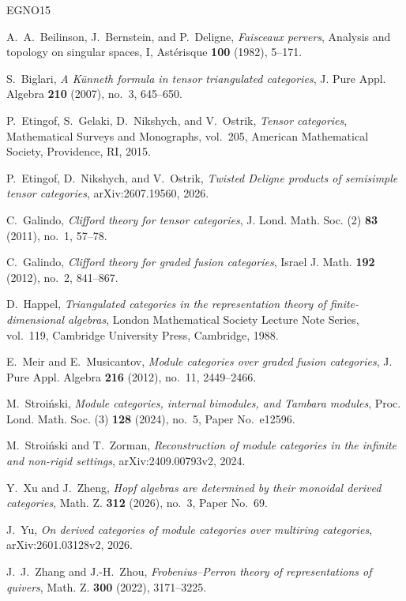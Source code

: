 \documentclass[11pt]{amsart}
\theoremstyle{definition}
\theoremstyle{remark}
\theoremstyle{plain}
\begin{document}
\begin{thebibliography}{EGNO15}

A.~A.~Beilinson, J.~Bernstein, and P.~Deligne,
\emph{Faisceaux pervers},
Analysis and topology on singular spaces, I,
Ast\'erisque \textbf{100} (1982), 5--171.

S.~Biglari,
\emph{A K\"unneth formula in tensor triangulated categories},
J. Pure Appl. Algebra \textbf{210} (2007), no.~3, 645--650.

P.~Etingof, S.~Gelaki, D.~Nikshych, and V.~Ostrik,
\emph{Tensor categories},
Mathematical Surveys and Monographs, vol.~205,
American Mathematical Society, Providence, RI, 2015.

P.~Etingof, D.~Nikshych, and V.~Ostrik,
\emph{Twisted Deligne products of semisimple tensor categories},
arXiv:2607.19560, 2026.

C.~Galindo,
\emph{Clifford theory for tensor categories},
J. Lond. Math. Soc. (2) \textbf{83} (2011), no.~1, 57--78.

C.~Galindo,
\emph{Clifford theory for graded fusion categories},
Israel J. Math. \textbf{192} (2012), no.~2, 841--867.

D.~Happel,
\emph{Triangulated categories in the representation theory of finite-dimensional algebras},
London Mathematical Society Lecture Note Series, vol.~119,
Cambridge University Press, Cambridge, 1988.

E.~Meir and E.~Musicantov,
\emph{Module categories over graded fusion categories},
J. Pure Appl. Algebra \textbf{216} (2012), no.~11, 2449--2466.

M.~Stroi\'nski,
\emph{Module categories, internal bimodules, and Tambara modules},
Proc. Lond. Math. Soc. (3) \textbf{128} (2024), no.~5,
Paper No.~e12596.

M.~Stroi\'nski and T.~Zorman,
\emph{Reconstruction of module categories in the infinite and non-rigid settings},
arXiv:2409.00793v2, 2024.

Y.~Xu and J.~Zheng,
\emph{Hopf algebras are determined by their monoidal derived categories},
Math. Z. \textbf{312} (2026), no.~3, Paper No.~69.

J.~Yu,
\emph{On derived categories of module categories over multiring categories},
arXiv:2601.03128v2, 2026.

J.~J.~Zhang and J.-H.~Zhou,
\emph{Frobenius--Perron theory of representations of quivers},
Math. Z. \textbf{300} (2022), 3171--3225.

\end{thebibliography}
\end{document}
